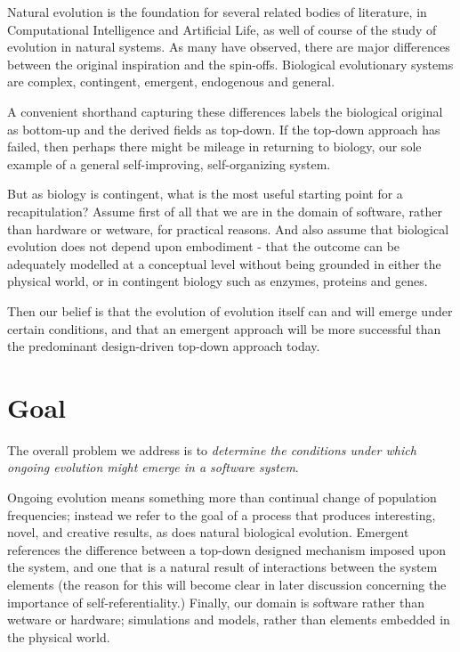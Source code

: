 \documentclass[]{report}
\begin{document}
Natural evolution is the foundation for several related bodies of literature, in Computational Intelligence and Artificial Life, as well of course of the study of evolution in natural systems. As many have observed, there are major differences between the original inspiration and the spin-offs. Biological evolutionary systems are complex, contingent, emergent, endogenous and general. 

A convenient shorthand capturing these differences labels the biological original as bottom-up and the derived fields as top-down. If the top-down approach has failed, then perhaps there might be mileage in returning to biology, our sole example of a general self-improving, self-organizing system.

But as biology is contingent, what is the most useful starting point for a recapitulation? Assume first of all that we are in the domain of software, rather than hardware or wetware, for practical reasons. And also assume that biological evolution does not depend upon embodiment - that the outcome can be adequately modelled at a conceptual level without being grounded in either the physical world, or in contingent biology such as enzymes, proteins and genes.

Then our belief is that the evolution of evolution itself can and will emerge under certain conditions, and that an emergent approach will be more successful than the predominant design-driven top-down approach today.

\section{Goal}

The overall problem we address is to \textit{determine the conditions under which ongoing evolution might emerge in a software system}. 

Ongoing evolution means something more than continual change of population frequencies; instead we refer to the goal of a process that produces  interesting, novel, and creative results, as does natural biological evolution. Emergent references the difference between a top-down designed mechanism imposed upon the system, and one that is a natural result of interactions between the system elements (the reason for this will become clear in later discussion concerning the importance of self-referentiality.) Finally, our domain is software rather than wetware or hardware; simulations and models, rather than elements embedded in the physical world.
\end{document}
